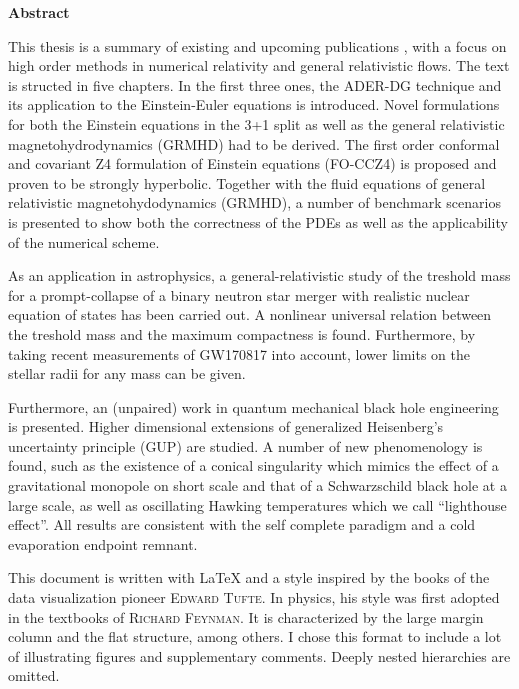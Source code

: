 \begin{fullwidth}

\begin{center}
\parbox{\textwidth}{
%
\begin{center}\textbf{Abstract}\end{center}

This thesis is a summary of existing and upcoming publications
\cite{Dumbser2017,Fambri2018,Koeppel2017,
	exahype-guidebook,Koeppel2019,FKN16,Koppel:2017rsf,Knipfer2019},
with a focus on high order methods in numerical relativity and general
relativistic flows.
The text is structed in five chapters. In the first three ones, the
ADER-DG technique and its application to the Einstein-Euler
equations is introduced. Novel formulations for both the Einstein
equations in the 3+1 split as well as the general relativistic
magnetohydrodynamics (GRMHD) had to be derived.
The first order conformal and covariant Z4 formulation of Einstein equations
(FO-CCZ4) is proposed and proven to be strongly hyperbolic.
Together with the fluid equations of general
relativistic magnetohydodynamics (GRMHD), a number of benchmark scenarios is
presented to show both the correctness of the PDEs as well as the
applicability of the numerical scheme.

As an application in astrophysics, a general-relativistic study of the
treshold mass for a prompt-collapse of a binary neutron star merger with
realistic nuclear equation of states has been carried out. A nonlinear
universal relation between the treshold mass and the maximum compactness
is found. Furthermore, by taking recent measurements of GW170817 into account,
lower limits on the stellar radii for any mass can be given.

Furthermore, an (unpaired) work in quantum mechanical black hole engineering
is presented. Higher dimensional extensions of generalized Heisenberg's
uncertainty principle (GUP) are studied. A number of new phenomenology is
found, such as the existence of a conical singularity which mimics the
effect of a gravitational monopole on short scale and that of a
Schwarzschild black hole at a large scale, as well as oscillating Hawking
temperatures which we call ``lighthouse effect''. All results are consistent
with the self complete paradigm and a cold evaporation endpoint remnant.
}%
\end{center}

	
\phantom{foo}\vfill

\textcolor{black!80!white}{
This document is written with \LaTeX{} and a style inspired by the books
of the data visualization pioneer \textsc{Edward Tufte}. In physics, his
style was first adopted in the textbooks of \textsc{Richard Feynman}.
It is characterized by the large margin column and the flat structure,
among others. I chose this format to include a lot of illustrating figures
and  supplementary comments. Deeply nested hierarchies are omitted.
} %


\end{fullwidth}
